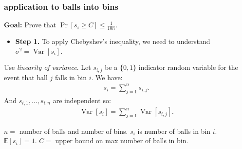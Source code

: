 \documentclass[compress]{beamer}
\newcommand{\E}{\mathbb{E}}
\DeclareMathOperator{\Var}{Var}
\begin{document}
%	
%	

\begin{frame}
	\frametitle{application to balls into bins}
	\textbf{Goal:} Prove that $\Pr[s_i \geq C] \leq \frac{1}{10n}$. 
	\begin{itemize}
		\item \textbf{Step 1.} To apply Chebyshev's inequality, we need to understand $\sigma^2 = \Var[s_i]$. 
	\end{itemize}
	Use \emph{linearity of variance}. Let $s_{i,j}$ be a $\{0,1\}$ indicator random variable for the event that ball $j$ falls in bin $i$. We have:
	\begin{align*}
		s_i = \sum_{j=1}^n s_{i,j}. 
	\end{align*}
	And $s_{i,1}, \ldots, s_{i,n}$ are  independent so:
	\begin{align*}
		\Var[s_i] = \sum_{j=1}^n \Var[s_{i,j}]. 
	\end{align*}
	
	\vspace{0em}
	\begin{block}{\vspace*{-3ex}}
		\small $n = $ number of balls and number of bins. $s_i$ is number of balls in bin $i$. $\E[s_i] = 1$. $C =$ upper bound on max number of balls in bin. 
	\end{block}
\end{frame}
\end{document}
